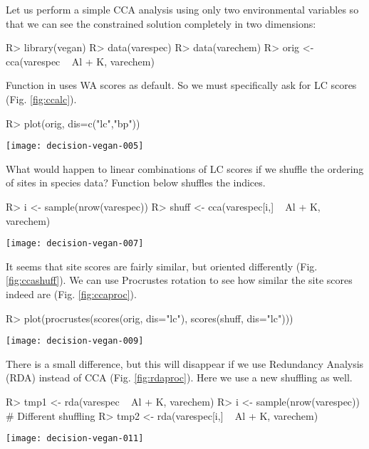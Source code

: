 \documentclass[article,nojss]{jss}
\begin{document}
Let us perform a simple CCA analysis using only two environmental
variables so that we can see the constrained solution completely in
two dimensions:
\begin{Schunk}
\begin{Sinput}
R> library(vegan)
R> data(varespec)
R> data(varechem)
R> orig <- cca(varespec ~ Al + K, varechem)
\end{Sinput}
\end{Schunk}
Function  in  uses WA scores as
default. So we must specifically ask for LC scores
(Fig. \ref{fig:ccalc}).
\begin{Schunk}
\begin{Sinput}
R> plot(orig, dis=c("lc","bp"))
\end{Sinput}
\end{Schunk}
\begin{SCfigure}
\texttt{[image: decision-vegan-005]}
\caption{LC scores in CCA of the original data.}
\label{fig:ccalc}
\end{SCfigure}

What would happen to linear combinations of LC scores if we shuffle
the ordering of sites in species data?  Function  below
shuffles the indices.
\begin{Schunk}
\begin{Sinput}
R> i <- sample(nrow(varespec))
R> shuff <- cca(varespec[i,] ~ Al + K, varechem)
\end{Sinput}
\end{Schunk}
\begin{SCfigure}
\texttt{[image: decision-vegan-007]}
\caption{LC scores of shuffled species data.}
\label{fig:ccashuff}
\end{SCfigure}
It seems that site scores are fairly similar, but oriented differently
(Fig. \ref{fig:ccashuff}).  We can use Procrustes rotation to see how
similar the site scores indeed are (Fig. \ref{fig:ccaproc}).
\begin{Schunk}
\begin{Sinput}
R> plot(procrustes(scores(orig, dis="lc"), scores(shuff, dis="lc")))
\end{Sinput}
\end{Schunk}
\begin{SCfigure}
\texttt{[image: decision-vegan-009]}
\caption{Procrustes rotation of LC scores from CCA of original and shuffled data.}
\label{fig:ccaproc}
\end{SCfigure}
There is a small difference, but this will disappear if we use
Redundancy Analysis (RDA) instead of CCA
(Fig. \ref{fig:rdaproc}). Here we use a new shuffling as well.
\begin{Schunk}
\begin{Sinput}
R> tmp1 <- rda(varespec ~ Al + K, varechem)
R> i <- sample(nrow(varespec)) # Different shuffling
R> tmp2 <- rda(varespec[i,] ~ Al + K, varechem)
\end{Sinput}
\end{Schunk}
\begin{SCfigure}
\texttt{[image: decision-vegan-011]}
\caption{Procrustes rotation of LC scores in RDA of the original and shuffled data.}
\label{fig:rdaproc}
\end{SCfigure}
\end{document}
